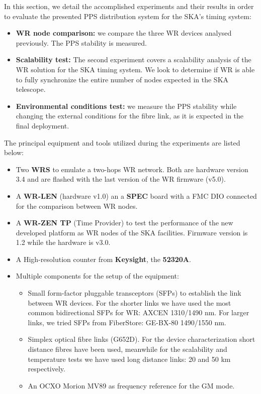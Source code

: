 
In this section, we detail the accomplished experiments and their results in 
order to evaluate the presented PPS distribution system for the SKA's timing 
system:

\begin{itemize}
	\item \textbf{WR node comparison:} we compare the three WR devices analysed 
	previously. The PPS stability is measured.
	\item \textbf{Scalability test:} The second experiment covers a scalability 
	analysis of the WR solution for the SKA timing system. We look to determine 
	if WR is able to fully synchronize the entire number of nodes expected in 
	the SKA telescope.
	\item \textbf{Environmental conditions test:} we measure the PPS stability 
	while changing the external conditions for the fibre link, as it is 
	expected in the final deployment.
\end{itemize}

The principal equipment and tools utilized during the experiments are listed 
below:

\begin{itemize}
    \item Two \textbf{WRS} to emulate a two-hops WR network. Both are 
    hardware version 3.4 and are flashed with the last version of the WR 
    firmware (v5.0).
    
    \item A \textbf{WR-LEN} (hardware v1.0) an a \textbf{SPEC} board with a FMC 
    DIO connected for the comparison between WR nodes.
    
    \item A \textbf{WR-ZEN TP} (Time Provider) to test the 
    performance of the new developed platform as WR nodes of the SKA 
    facilities. Firmware version is 1.2 while the hardware is v3.0.
    
    \item A High-resolution counter from \textbf{Keysight}, the \textbf{52320A}.
    
    \item Multiple components for the setup of the equipment:
    \begin{itemize}
        \item Small form-factor pluggable transceptors (SFPs) to establish the 
        link between WR devices. For the shorter links we have used the most 
        common bidirectional SFPs for WR: AXCEN 1310/1490 nm. For larger links, 
        we tried 
        SFPs from FiberStore: GE-BX-80 1490/1550 nm.
        \item Simplex optical fibre links (G652D). For the device 
        characterization short distance fibres have been used, meanwhile for 
        the scalability and temperature tests we have used long distance links: 
        20 and 50 km respectively.
        \item An OCXO Morion MV89 as frequency reference for the GM mode.
    \end{itemize}
    
\end{itemize}

